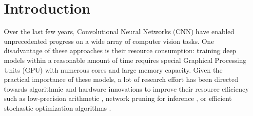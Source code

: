 \documentclass[twocolumn]{bmcart}
\begin{document}
\begin{frontmatter}
\begin{fmbox}
\begin{abstractbox}

\begin{keyword}
\end{keyword}


\end{abstractbox}
\end{fmbox}%
\end{frontmatter}




\section{Introduction}
Over the last few years, Convolutional Neural Networks (CNN) have enabled unprecedented progress on a wide array of computer vision tasks.
One disadvantage of these approaches is their resource consumption: 
training deep models within a reasonable amount of time requires special
Graphical Processing Units (GPU) with numerous cores and large memory capacity.
Given the practical importance of these models, a lot of research effort has been directed
towards algorithmic and hardware innovations to improve their resource efficiency such as low-precision arithmetic \cite{jacob2018quantization}, network pruning for inference \cite{molchanov2016pruning}, or efficient stochastic optimization algorithms \cite{kingma2014adam}.
\end{document}
